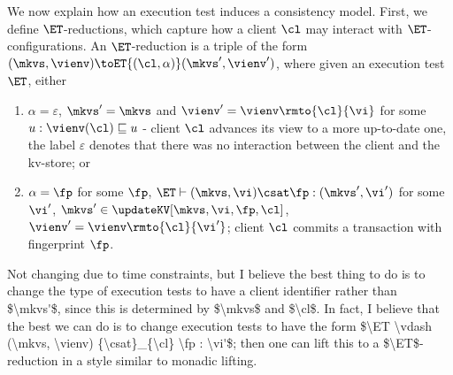 We now explain how an execution test induces a consistency model. First, 
we define $\ET$-reductions, which capture how a client $\cl$ may interact with $\ET$-configurations. 
An $\ET$-reduction is a triple of the form $(\mkvs, \vienv) \toET{(\cl, \alpha)} (\mkvs', \vienv')$, 
where given an execution test  $\ET$, either 
\begin{enumerate}
    \item $\alpha = \varepsilon$, $\mkvs' = \mkvs$ and $\vienv' = \vienv\rmto{\cl}{\vi}$ for some $u: \vienv(\cl) \sqsubseteq u$ - 
	client $\cl$ advances its view to a more up-to-date one, the label $\varepsilon$ denotes that there was no interaction between the client and the kv-store; or 
\item $\alpha = \fp$ for some $\fp$, $\ET \vdash (\mkvs, \vi ) \csat \fp : (\mkvs', \vi')$ for some $\vi'$, $\mkvs' \in \updateKV[\mkvs, \vi, \fp, \cl]$, 
    $\vienv' = \vienv\rmto{\cl}{\vi'}$; client $\cl$ 
	commits a transaction with fingerprint $\fp$.
\end{enumerate}
\ac{Not changing due to time constraints, but I believe the best thing to do is to change the type of execution tests to have a client identifier 
rather than $\mkvs'$, since this is determined by $\mkvs$ and $\cl$. In fact, I believe that the best we can do is to change execution tests to 
have the form $\ET \vdash (\mkvs, \vienv) {\csat}_{\cl} \fp : \vi'$; then one can lift this to a $\ET$-reduction in a style similar to monadic lifting.}

